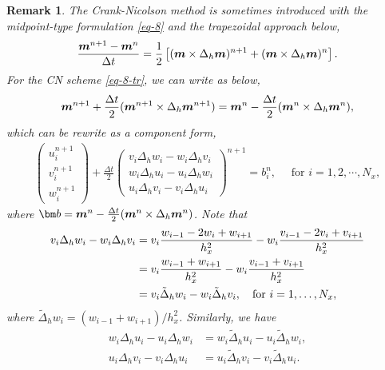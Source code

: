 \documentclass[preprint,times,3p]{elsarticle}
\newtheorem{remark}{Remark}
\def\m{\mbox{\boldmath $m$}}
\begin{document}
\begin{remark}
The Crank-Nicolson method is sometimes introduced with the midpoint-type formulation \cref{eq-8} and the trapezoidal approach below,
\begin{align}\label{eq-8-tr}
    \frac{\m^{n+1}-\m^n}{\Delta t}=\frac12 \left[ (\m\times \Delta_h \m)^{n+1}+(\m\times \Delta_h \m)^n\right].
\end{align}
For the CN scheme \cref{eq-8-tr}, we can write as below,
\begin{align}\label{eq-11}
    \m^{n+1}+\frac{\Delta t}{2}(\m^{n+1}\times \Delta_h \m^{n+1})=\m^n-\frac{\Delta t}{2}(\m^n\times \Delta_h \m^n),
\end{align}
which can be rewrite as a component form,
\begin{align}\label{eq-13}
    \begin{pmatrix}
        u_i^{n+1}\\
        v_i^{n+1}\\
        w_i^{n+1}
    \end{pmatrix}+\frac{\Delta t}{2}\begin{pmatrix}
        v_i\Delta_h w_i-w_i\Delta_h v_i\\
        w_i\Delta_h u_i-u_i\Delta_h w_i\\
        u_i\Delta_h v_i-v_i\Delta_h u_i
    \end{pmatrix}^{n+1}=b_i^n,\quad \text{ for } i=1,2,\cdots,N_x,
\end{align}
where ${\bm b}=\m^n-\frac{\Delta t}{2}(\m^n\times \Delta_h \m^n)$. Note that
\begin{align}
v_i \Delta_h w_i - w_i \Delta_h v_i 
&= v_i \frac{w_{i-1} - 2w_i + w_{i+1}}{h_x^2} - w_i \frac{v_{i-1} - 2v_i + v_{i+1}}{h_x^2} \notag \\
&= v_i \frac{w_{i-1} + w_{i+1}}{h_x^2} - w_i \frac{v_{i-1} + v_{i+1}}{h_x^2} \notag \\
&= v_i \tilde{\Delta}_h w_i - w_i \tilde{\Delta}_h v_i, \quad \text{for } i = 1, \dots, N_x,
\label{eq:cancel1}
\end{align}
where \(\tilde{\Delta}_h w_i = (w_{i-1} + w_{i+1})/h_x^2\). Similarly, we have
\begin{align}
w_i \Delta_h u_i - u_i \Delta_h w_i &= w_i \tilde{\Delta}_h u_i - u_i \tilde{\Delta}_h w_i,
\label{eq:cancel2} \\
u_i \Delta_h v_i - v_i \Delta_h u_i &= u_i \tilde{\Delta}_h v_i - v_i \tilde{\Delta}_h u_i.
\label{eq:cancel3}
\end{align}


\end{remark}
\end{document}
